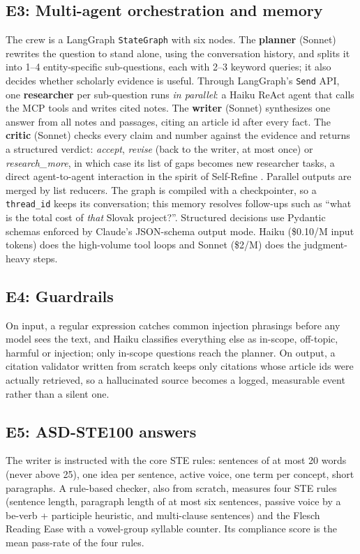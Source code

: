 \subsection{E3: Multi-agent orchestration and memory}
The crew is a LangGraph \texttt{StateGraph} with six nodes. The \textbf{planner} (Sonnet) rewrites the
question to stand alone, using the conversation history, and splits it into 1--4 entity-specific
sub-questions, each with 2--3 keyword queries; it also decides whether scholarly evidence is useful. Through
LangGraph's \texttt{Send} API, one \textbf{researcher} per sub-question runs \emph{in parallel}: a Haiku ReAct
agent that calls the MCP tools and writes cited notes. The \textbf{writer} (Sonnet) synthesizes one answer
from all notes and passages, citing an article id after every fact. The \textbf{critic} (Sonnet) checks every
claim and number against the evidence and returns a structured verdict: \emph{accept}, \emph{revise} (back to
the writer, at most once) or \emph{research\_more}, in which case its list of gaps becomes new researcher tasks,
a direct agent-to-agent interaction in the spirit of Self-Refine \cite{madaan2023selfrefine}. Parallel
outputs are merged by list reducers. The graph is compiled with a checkpointer, so a \texttt{thread\_id}
keeps its conversation; this memory resolves follow-ups such as ``what is the total cost of \emph{that}
Slovak project?''. Structured decisions use Pydantic schemas enforced by Claude's JSON-schema output mode.
Haiku (\$0.10/M input tokens) does the high-volume tool loops and Sonnet (\$2/M) does the judgment-heavy
steps.

\subsection{E4: Guardrails}
On input, a regular expression catches common injection phrasings before any model sees the text, and Haiku
classifies everything else as in-scope, off-topic, harmful or injection; only in-scope questions reach the
planner. On output, a citation validator written from scratch keeps only citations whose article ids were
actually retrieved, so a hallucinated source becomes a logged, measurable event rather than a silent one.

\subsection{E5: ASD-STE100 answers}
The writer is instructed with the core STE rules: sentences of at most 20 words (never above 25), one idea
per sentence, active voice, one term per concept, short paragraphs. A rule-based checker, also from scratch,
measures four STE rules (sentence length, paragraph length of at most six sentences, passive voice by a
be-verb + participle heuristic, and multi-clause sentences) and the Flesch Reading Ease \cite{flesch1948}
with a vowel-group syllable counter. Its compliance score is the mean pass-rate of the four rules.

